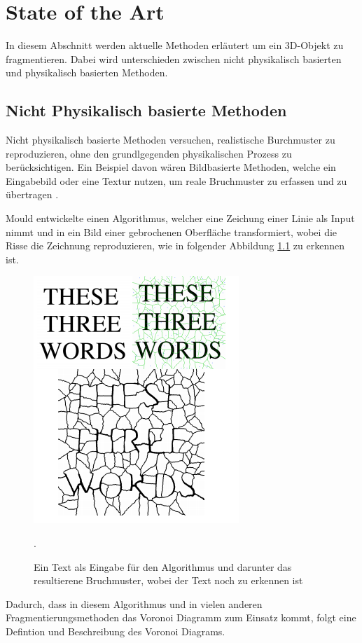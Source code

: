 \chapter{State of the Art}

In diesem Abschnitt werden aktuelle Methoden erläutert um ein 3D-Objekt zu fragmentieren. Dabei wird unterschieden zwischen nicht physikalisch basierten und
physikalisch basierten Methoden. 

\section{Nicht Physikalisch basierte Methoden}

Nicht physikalisch basierte Methoden versuchen, realistische Burchmuster zu reproduzieren, ohne den grundlgegenden physikalischen Prozess zu berücksichtigen.
Ein Beispiel davon wären Bildbasierte Methoden, welche ein Eingabebild oder eine Textur nutzen, um reale Bruchmuster zu erfassen 
und zu übertragen \cite{Torres.FractureModelingSurvey}.

Mould \cite{Mould.Image-guidedFracture} entwickelte einen Algorithmus, welcher eine Zeichung einer Linie als Input nimmt und in ein Bild 
einer gebrochenen Oberfläche transformiert, wobei die Risse die Zeichnung reproduzieren, wie in folgender Abbildung \ref{fig:imagebasedVoronoi} zu erkennen ist.

\begin{figure}[H]
    \centering
    \includegraphics[width=0.45\linewidth]{PICs/imagebasedFractureVoronoi.PNG}
    \caption{Ein Text als Eingabe für den Algorithmus und darunter das resultierene Bruchmuster, wobei der Text noch zu erkennen ist
    \protect\cite{Mould.Image-guidedFracture}}.
    \label{fig:imagebasedVoronoi}
\end{figure}

Dadurch, dass in diesem Algorithmus und in vielen anderen Fragmentierungsmethoden das Voronoi Diagramm zum Einsatz kommt, folgt eine Defintion und Beschreibung 
des Voronoi Diagrams.


